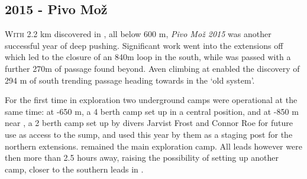 \newpage
\begin{tcolorbox}
\chapter{2015 - Pivo Mo\v{z}}
		\lettrine{W}{ith} 2.2 km discovered in , all below 600 m, \emph{Pivo Mo\v{z} 2015} was another successful year of deep pushing. Significant work went into the extensions off  which led to the closure of an 840m loop in the south, while  was passed with a further 270m of passage found beyond. Aven climbing at  enabled the discovery of 294 m of south trending passage heading towards  in the ‘old system’. 

		For the first time in  exploration two underground camps were operational at the same time: at -650 m, a 4 berth camp set up in a central position, and  at -850 m near , a 2 berth camp set up by divers Jarvist Frost and Connor Roe for future use as access to the  sump, and used this year by them as a staging post for the northern extensions.  remained the main exploration camp. All leads however were then more than 2.5 hours away, raising the possibility of setting up another camp, closer to the southern leads in .
	

\end{tcolorbox}
\BgThispage



